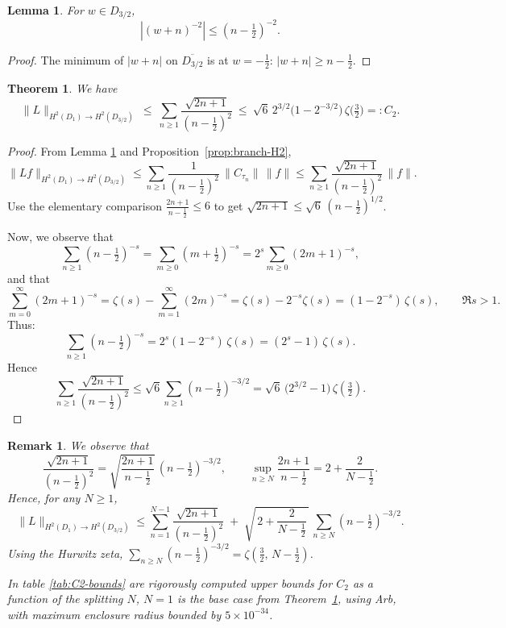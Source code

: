\documentclass[11pt]{article}
\newtheorem{remark}[definition]{Remark}
\newtheorem{lemma}[definition]{Lemma}
\newtheorem{theorem}[definition]{Theorem}
\begin{document}
\begin{lemma}\label{lem:weight-bound}
For \(w\in D_{3/2}\),
\[
|(w+n)^{-2}|\le(n-\tfrac12)^{-2}.
\]
\end{lemma}

\begin{proof}
The minimum of \(|w+n|\) on \(\overline{D_{3/2}}\) is at \(w=-\tfrac12\):
\(|w+n|\ge n-\tfrac12\).
\end{proof}

\begin{theorem}
\label{thm:L1-H2-bound}
We have
\[
\|L\|_{H^2(D_1)\to H^2(D_{3/2})}
\ \le\
\sum_{n\ge1}\frac{\sqrt{2n+1}}{(n-\tfrac12)^2}
\ \le\
\sqrt{6}\,2^{3/2}\!\bigl(1-2^{-3/2}\bigr)\,\zeta\!\Big(\tfrac32\Big)
=:C_{2}.
\]
\end{theorem}
\begin{proof}
From Lemma \ref{lem:weight-bound} and Proposition~\ref{prop:branch-H2},
\[
\|L f\|_{H^2(D_1)\to H^2(D_{3/2})}
\le \sum_{n\ge1}\frac{1}{(n-\tfrac12)^2}\,\|C_{\tau_n}\|\,\|f\|
\le \sum_{n\ge1}\frac{\sqrt{2n+1}}{(n-\tfrac12)^2}\,\|f\|.
\]
Use the elementary comparison
\(
\frac{2n+1}{n-\tfrac12}\le 6
\)
to get \(\sqrt{2n+1}\le \sqrt6\,(n-\tfrac12)^{1/2}\).

Now, we observe that 
\[
\sum_{n\geq 1}(n-\tfrac12)^{-s} = \sum_{m\geq 0}(m+\tfrac12)^{-s} = 2^s\sum_{m\geq 0}(2m+1)^{-s},
\]
and that 
\[
\sum_{m=0}^\infty (2m+1)^{-s}
= \zeta(s)-\sum_{m=1}^\infty (2m)^{-s}
= \zeta(s)-2^{-s}\zeta(s)
= (1-2^{-s})\,\zeta(s), \qquad \Re s>1.
\]
Thus:
\[
\sum_{n\geq 1}(n-\tfrac12)^{-s} = 2^s (1-2^{-s})\,\zeta(s) = (2^s - 1)\,\zeta(s).
\]
Hence
\[
\sum_{n\ge1}\frac{\sqrt{2n+1}}{(n-\tfrac12)^2}
\le \sqrt6\sum_{n\ge1}(n-\tfrac12)^{-3/2}
=\sqrt6\,\!\bigl(2^{3/2}-1\bigr)\,\zeta(\tfrac32).
\]
\end{proof}
\begin{remark}
We observe that
\[
\frac{\sqrt{2n+1}}{(n-\tfrac12)^2}
=\sqrt{\frac{2n+1}{\,n-\tfrac12\,}}\,(n-\tfrac12)^{-3/2},
\qquad
\sup_{n\ge N}\frac{2n+1}{n-\tfrac12}
=2+\frac{2}{N-\tfrac12}.
\]
Hence, for any $N\ge1$,
\[
\|L\|_{H^2(D_1)\to H^2(D_{3/2})}
\le \sum_{n=1}^{N-1}\frac{\sqrt{2n+1}}{(n-\tfrac12)^2}
\;+\;\sqrt{\,2+\frac{2}{N-\tfrac12}\,}\,
\sum_{n\ge N}(n-\tfrac12)^{-3/2}.
\]
Using the Hurwitz zeta,
\(\displaystyle \sum_{n\ge N}(n-\tfrac12)^{-3/2}=\zeta\!\left(\tfrac32,\,N-\tfrac12\right)\).

In table \ref{tab:C2-bounds} are rigorously computed upper bounds for $C_2$ as a function of the splitting $N$, $N=1$ is the base case from Theorem~\ref{thm:L1-H2-bound},
using Arb, with maximum enclosure radius bounded by $5\times10^{-34}$.

\end{remark}
\end{document}
